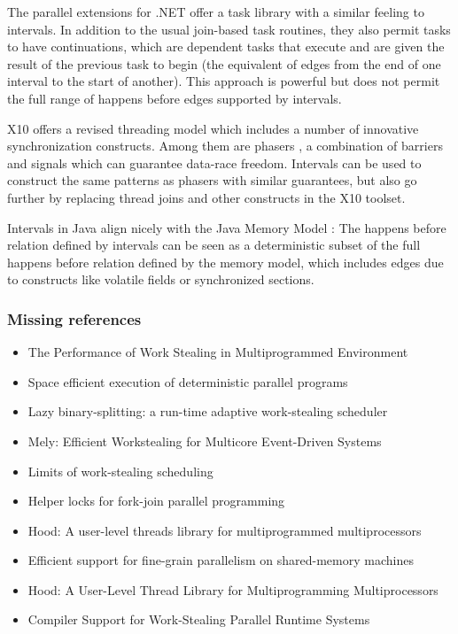 The parallel extensions for .NET \cite{Leijen2009} offer a task
library with a similar feeling to intervals. In addition to the usual
join-based task routines, they also permit tasks to have
continuations, which are dependent tasks that execute and are given
the result of the previous task to begin (the equivalent of edges from
the end of one interval to the start of another). This approach is
powerful but does not permit the full range of happens before edges
supported by intervals.

X10 \cite{Charles2005, Saraswat2010} offers a revised threading model
which includes a number of innovative synchronization
constructs. Among them are phasers \cite{Shirako2008, Shirako2010}, a
combination of barriers and signals which can guarantee data-race
freedom. Intervals can be used to construct the same patterns as
phasers with similar guarantees, but also go further by replacing
thread joins and other constructs in the X10 toolset.

Intervals in Java align nicely with the Java Memory Model
\cite{Manson2005}: The happens before relation defined by intervals
can be seen as a deterministic subset of the full happens before
relation defined by the memory model, which includes edges due to
constructs like volatile fields or synchronized sections.

\subsubsection{Missing references}

\begin{itemize}
\item The Performance of Work Stealing in Multiprogrammed Environment
  \cite{Blumofe1998a}
\item Space efficient execution of deterministic parallel programs
  \cite{Simpson1999}
\item Lazy binary-splitting: a run-time adaptive work-stealing
  scheduler \cite{Tzannes2010}
\item Mely: Efficient Workstealing for Multicore Event-Driven Systems
  \cite{Gaud2010}
\item Limits of work-stealing scheduling \cite{Vrba2009}
\item Helper locks for fork-join parallel programming
  \cite{Agrawal2010}
\item Hood: A user-level threads library for multiprogrammed
  multiprocessors \cite{Blumofe1998}
\item Efficient support for fine-grain parallelism on shared-memory
  machines \cite{Lowenthal1998}
\item Hood: A User-Level Thread Library for Multiprogramming
  Multiprocessors \cite{Papadopoulos1998}
\item Compiler Support for Work-Stealing Parallel Runtime Systems
  \cite{Raman2009}
\end{itemize}


